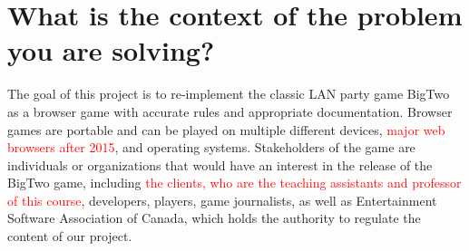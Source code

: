 \documentclass{article}
\begin{document}
\section{What is the context of the problem you are solving?}

The goal of this project is to re-implement the classic LAN party game BigTwo as a browser game with accurate rules and appropriate documentation. Browser games are portable and can be played on multiple different devices, \textcolor{red}{major web browsers after 2015}, and operating systems. Stakeholders of the game are individuals or organizations that would have an interest in the release of the BigTwo game, including \textcolor{red}{the clients, who are the teaching assistants and professor of this course}, developers, players, game journalists, as well as Entertainment Software Association of Canada, which holds the authority to regulate the content of our project.
\end{document}
